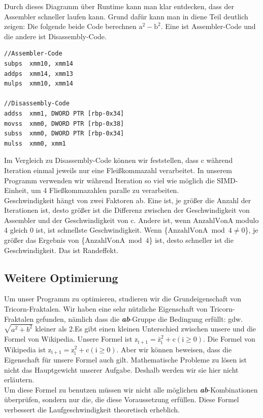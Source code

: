 \documentclass[course=erap]{aspdoc}
\begin{document}
Durch dieses Diagramm über Runtime kann man klar entdecken, dass der Assembler  schneller laufen kann. Grund dafür kann man in diene Teil deutlich zeigen:
Die folgende beide Code berechnen $\mathrm{a^2} -\mathrm{b^2}$. Eine ist Assembler-Code und die andere ist Disassembly-Code.
 \begin{lstlisting}
//Assembler-Code
subps  xmm10, xmm14
addps  xmm14, xmm13
mulps  xmm10, xmm14

//Disassembly-Code
addss  xmm1, DWORD PTR [rbp-0x34]
movss  xmm0, DWORD PTR [rbp-0x38]
subss  xmm0, DWORD PTR [rbp-0x34]
mulss  xmm0, xmm1
 \end{lstlisting}
Im Vergleich zu Disassembly-Code können wir feststellen, dass c während Iteration einmal jeweils nur eine Fleißkommazahl verarbeitet. In unserem Programm verwenden wir während Iteration so viel wie möglich die SIMD-Einheit, um 4 Fließkommazahlen paralle zu verarbeiten.
\\Geschwindigkeit hängt von zwei Faktoren ab. Eine ist, je größer die Anzahl der Iterationen ist, desto größer ist die Differenz zwischen der Geschwindigkeit von Assembler und der Geschwindigkeit von c. Andere ist, wenn $\mathrm{AnzahlVonA}$ modulo 4 gleich 0 ist, ist schnellste Geschwindigkeit. Wenn \{$\mathrm{AnzahlVonA} \bmod 4 \neq 0$\}, je größer das Ergebnis von \{$\mathrm{AnzahlVonA} \bmod 4$\} ist, desto schneller ist die Geschwindigkeit. Das ist Randeffekt.

\subsection{Weitere Optimierung}
Um unser Programm zu optimieren, studieren wir die Grundeigenschaft von Tricorn-Fraktalen. Wir haben eine sehr nützliche Eigenschaft von Tricorn-Fraktalen gefunden, nämlich dass die \textbf{\emph{ab}}-Gruppe die Bedingung erfüllt: gdw. $\sqrt{a^{2}+b^{2}}$ kleiner als 2.\cite{wiki:mandelbrot}Es gibt einen kleinen Unterschied zwischen unsere und die Formel von Wikipedia. Unsere Formel ist $\mathrm{z_{i+1}}=\mathrm{\bar{z}_{i}^{2}}+\mathrm{c}(\mathrm{i} \geq 0)$. Die Formel von Wikipedia  ist $\mathrm{z_{i+1}}=\mathrm{{z}_{i}^{2}}+\mathrm{c}(\mathrm{i} \geq 0)$. Aber wir können beweisen, dass die Eigenschaft für unsere Formel auch gilt. Mathematische Probleme zu lösen ist nicht das Hauptgewicht unserer Aufgabe. Deshalb werden wir sie hier nicht erläutern.
\\Um diese Formel zu benutzen müssen wir nicht alle möglichen \emph{\textbf{ab}}-Kombinationen überprüfen, sondern nur die, die diese Voraussetzung erfüllen. Diese Formel verbessert die Laufgeschwindigkeit theoretisch erheblich.
\end{document}
